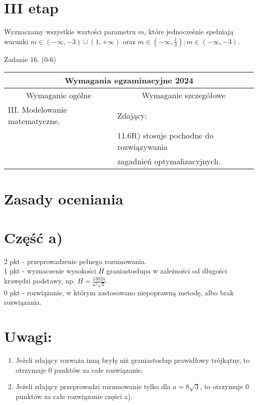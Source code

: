 \documentclass[10pt]{article}
\begin{document}
\section*{III etap}
Wyznaczamy wszystkie wartości parametru $m$, które jednocześnie spełniają warunki $m \in(-\infty,-3) \cup(1,+\infty)$ oraz $m \in\left(-\infty, \frac{1}{3}\right): m \in(-\infty,-3)$.

Zadanie 16. (0-6)

\begin{center}
\begin{tabular}{|l|l|}
\hline
\multicolumn{2}{|c|}{Wymagania egzaminacyjne 2024} \\
\hline
\multicolumn{1}{|c|}{Wymaganie ogólne} & \multicolumn{1}{|c|}{Wymaganie szczegółowe} \\
\hline
III. Modelowanie matematyczne. & Zdający: \\
 & 11.6R) stosuje pochodne do rozwiązywania \\
 & zagadnień optymalizacyjnych. \\
\hline
\end{tabular}
\end{center}

\section*{Zasady oceniania}
\section*{Część a)}
2 pkt - przeprowadzenie pełnego rozumowania.\\
1 pkt - wyznaczenie wysokości $H$ graniastosłupa w zależności od długości krawędzi podstawy, np. $H=\frac{13824}{a^{2} \sqrt{3}}$.\\
0 pkt - rozwiązanie, w którym zastosowano niepoprawną metodę, albo brak rozwiązania.

\section*{Uwagi:}
\begin{enumerate}
  \item Jeżeli zdający rozważa inną bryłę niż graniastosłup prawidłowy trójkątny, to otrzymuje 0 punktów za całe rozwiązanie.
  \item Jeżeli zdający przeprowadzi rozumowanie tylko dla $a=8 \sqrt{3}$, to otrzymuje 0 punktów za całe rozwiązanie części a).
\end{enumerate}
\end{document}
